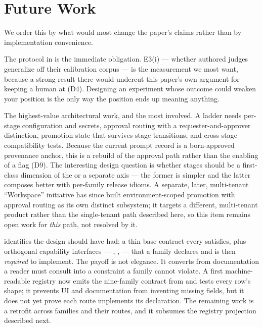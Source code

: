\section{Future Work}
\label{sec:future}

We order this by what would most change the paper's claims rather than by
implementation convenience.

 The protocol in  is the
immediate obligation. E3(i) --- whether authored judges generalize off their
calibration corpus --- is the measurement we most want, because a strong result
there would undercut this paper's own argument for keeping a human at 
(D4). Designing an experiment whose outcome could weaken your position is the only
way the position ends up meaning anything.

 The highest-value architectural work, and the
most involved. A \arrowto{}\arrowto{} ladder needs
per-stage configuration and secrets, approval routing with a requester-and-approver
distinction, promotion state that survives stage transitions, and cross-stage
compatibility tests. Because the current prompt record is a born-approved provenance
anchor, this is a rebuild of the approval path rather than the enabling of a flag
(D9). The interesting design question is whether stages should be a first-class
dimension of the \livetarget{} or a separate axis --- the former is simpler and the
latter composes better with per-family release idioms. A separate, later,
multi-tenant ``Workspace'' initiative has since built environment-scoped
promotion with approval routing as its own distinct subsystem; it targets a
different, multi-tenant product rather than the single-tenant path described
here, so this item remains open work for \emph{this} path, not resolved by it.

 
identifies the design \sys should have had: a thin base contract every \gasset{}
satisfies, plus orthogonal capability interfaces --- ,
,  --- that a family declares and is then
\emph{required} to implement. The payoff is not elegance. It converts
 from documentation a reader must consult into a constraint a
family cannot violate. A first machine-readable registry now emits the nine-family
contract from  and tests every row's shape; it prevents UI and
documentation from inventing missing fields, but it does not yet prove each route
implements its declaration. The remaining work is a retrofit across
\statFamilies{} families and their routes, and it subsumes the registry projection
described next.

